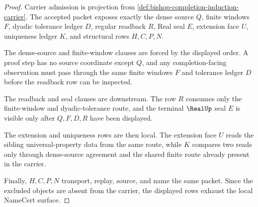 \begin{proof}
Carrier admission is projection from \autoref{def:bishop-completion-induction-carrier}. The accepted packet exposes exactly the dense source $Q$, finite windows $F$, dyadic tolerance ledger $D$, regular readback $R$, Real seal $E$, extension face $U$, uniqueness ledger $K$, and structural rows $H,C,P,N$.

The dense-source and finite-window clauses are forced by the displayed order. A proof step has no source coordinate except $Q$, and any completion-facing observation must pass through the same finite windows $F$ and tolerance ledger $D$ before the readback row can be inspected.

The readback and seal clauses are downstream. The row $R$ consumes only the finite-window and dyadic-tolerance route, and the terminal $\RealUp$ seal $E$ is visible only after $Q,F,D,R$ have been displayed.

The extension and uniqueness rows are then local. The extension face $U$ reads the sibling universal-property data from the same route, while $K$ compares two reads only through dense-source agreement and the shared finite route already present in the carrier.

Finally, $H,C,P,N$ transport, replay, source, and name the same packet. Since the excluded objects are absent from the carrier, the displayed rows exhaust the local NameCert surface.
\end{proof}


